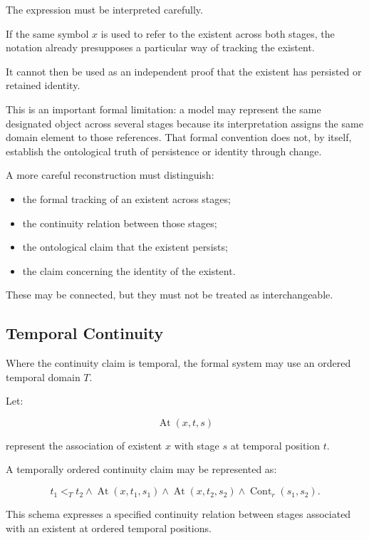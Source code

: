 The expression must be interpreted
carefully.

If the same symbol \(x\) is used to
refer to the existent across both
stages, the notation already presupposes
a particular way of tracking the
existent.

It cannot then be used as an
independent proof that the existent
has persisted or retained identity.

This is an important formal limitation:
a model may represent the same
designated object across several
stages because its interpretation
assigns the same domain element
to those references. That formal
convention does not, by itself,
establish the ontological truth
of persistence or identity through
change.

A more careful reconstruction
must distinguish:

\begin{itemize}
    \item the formal tracking of an
    existent across stages;
    \item the continuity relation
    between those stages;
    \item the ontological claim that
    the existent persists;
    \item the claim concerning the
    identity of the existent.
\end{itemize}

These may be connected, but they
must not be treated as interchangeable.

\subsection{Temporal Continuity}

Where the continuity claim is temporal,
the formal system may use an ordered
temporal domain \(T\).

Let:

\[
    \operatorname{At}(x,t,s)
\]

represent the association of existent
\(x\) with stage \(s\) at temporal
position \(t\).

A temporally ordered continuity
claim may be represented as:

\[
    t_1 <_T t_2
    \land
    \operatorname{At}(x,t_1,s_1)
    \land
    \operatorname{At}(x,t_2,s_2)
    \land
    \operatorname{Cont}_{r}(s_1,s_2).
\]

This schema expresses a specified
continuity relation between stages
associated with an existent at
ordered temporal positions.

